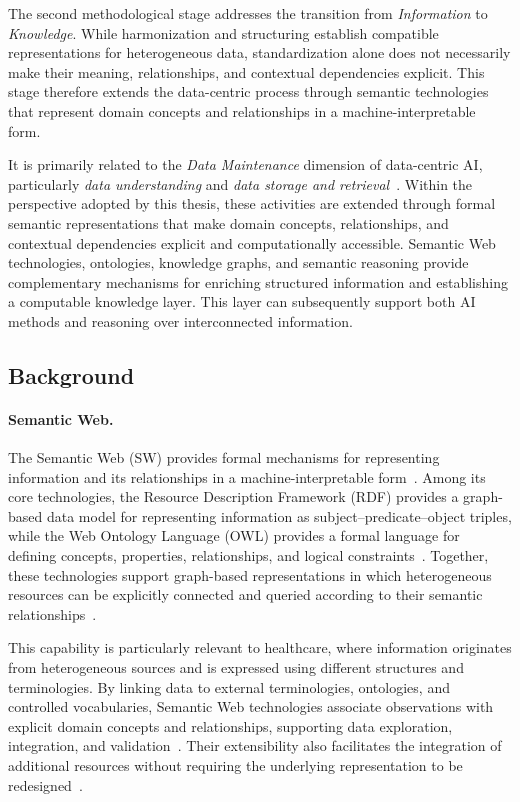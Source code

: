 The second methodological stage addresses the transition from \emph{Information} to \emph{Knowledge}. While harmonization and structuring establish compatible representations for heterogeneous data, standardization alone does not necessarily make their meaning, relationships, and contextual dependencies explicit. This stage therefore extends the data-centric process through semantic technologies that represent domain concepts and relationships in a machine-interpretable form.

It is primarily related to the \emph{Data Maintenance} dimension of data-centric AI, particularly \emph{data understanding} and \emph{data storage and retrieval}~\cite{zha_data-centric_2025}. Within the perspective adopted by this thesis, these activities are extended through formal semantic representations that make domain concepts, relationships, and contextual dependencies explicit and computationally accessible. Semantic Web technologies, ontologies, knowledge graphs, and semantic reasoning provide complementary mechanisms for enriching structured information and establishing a computable knowledge layer. This layer can subsequently support both AI methods and reasoning over interconnected information.

\subsection{Background}
\label{subsec:semantic_background}

\paragraph{Semantic Web.}

The Semantic Web (SW) provides formal mechanisms for representing information and its relationships in a machine-interpretable form~\cite{rathee_semantic_2025}. Among its core technologies, the Resource Description Framework (RDF) provides a graph-based data model for representing information as subject--predicate--object triples, while the Web Ontology Language (OWL) provides a formal language for defining concepts, properties, relationships, and logical constraints~\cite{amato_semfedxai_2025,xhani_role_2025}. Together, these technologies support graph-based representations in which heterogeneous resources can be explicitly connected and queried according to their semantic relationships~\cite{rathee_semantic_2025}.

This capability is particularly relevant to healthcare, where information originates from heterogeneous sources and is expressed using different structures and terminologies. By linking data to external terminologies, ontologies, and controlled vocabularies, Semantic Web technologies associate observations with explicit domain concepts and relationships, supporting data exploration, integration, and validation~\cite{toure2023}. Their extensibility also facilitates the integration of additional resources without requiring the underlying representation to be redesigned~\cite{rathee_semantic_2025}.

